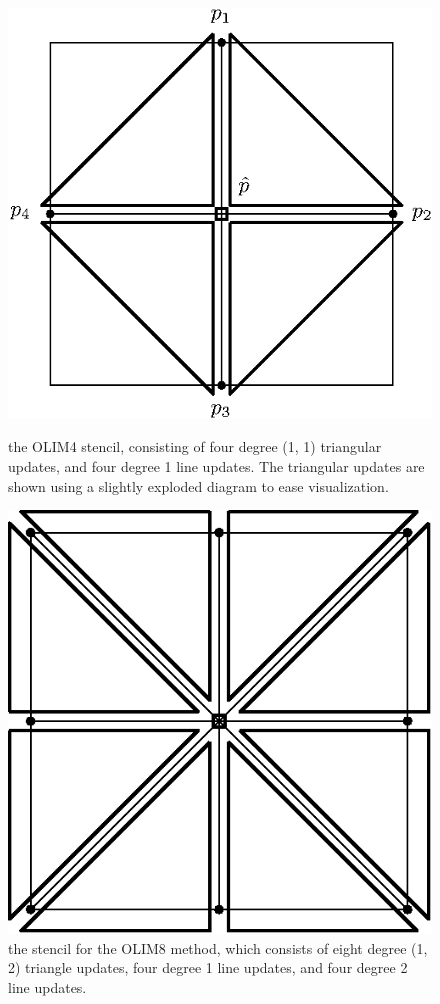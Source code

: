 \documentclass{article}
\begin{document}
\begin{figure}
  \centering
  \begin{minipage}[c]{0.45\textwidth}
    \centering
    \includegraphics[width=\textwidth]{olim4-stencil.eps}
    \caption{the OLIM4 stencil, consisting of four degree (1, 1)
      triangular updates, and four degree 1 line updates. The
      triangular updates are shown using a slightly exploded diagram
      to ease visualization.}
  \end{minipage}
  \hfill
  \begin{minipage}[c]{0.45\textwidth}
    \centering
    \includegraphics[width=\textwidth]{olim8-stencil.eps}
    \caption{the stencil for the OLIM8 method, which consists of eight
      degree (1, 2) triangle updates, four degree 1 line updates, and
      four degree 2 line updates.}
  \end{minipage}
\end{figure}
\end{document}
